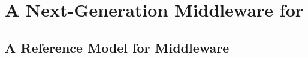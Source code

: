 \documentclass[a4paper, 10pt]{book}
\begin{document}



            \chapter{A Next-Generation Middleware for \MMORGS}


            \section{A Reference Model for Middleware}
\end{document}
